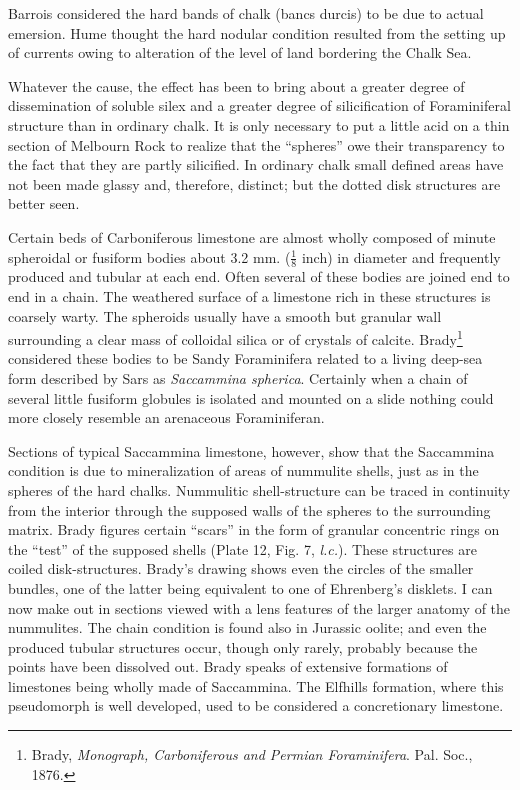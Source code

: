 \documentclass[a4paper, 12pt, oneside, landscape]{article}
\begin{document}
Barrois considered the hard bands of chalk (bancs durcis) to be due to actual emersion. Hume thought the hard nodular condition resulted from the setting up of currents owing to alteration of the level of land bordering the Chalk Sea.

Whatever the cause, the effect has been to bring about a greater degree of dissemination of soluble silex and a greater degree of silicification of Foraminiferal structure than in ordinary chalk. It is only necessary to put a little acid on a thin section of Melbourn Rock to realize that the ``spheres'' owe their transparency to the fact that they are partly silicified. In ordinary chalk small defined areas have not been made glassy and, therefore, distinct; but the dotted disk structures are better seen.

Certain beds of Carboniferous limestone are almost wholly composed of minute spheroidal or fusiform bodies about 3.2 mm. ($\frac{1}{8}$ inch) in diameter and frequently produced and tubular at each end. Often several of these bodies are joined end to end in a chain. The weathered surface of a limestone rich in these structures is coarsely warty. The spheroids usually have a smooth but granular wall surrounding a clear mass of colloidal silica or of crystals of calcite. Brady\footnote{Brady, \emph{Monograph, Carboniferous and Permian Foraminifera}. Pal. Soc., 1876.} considered these bodies to be Sandy Foraminifera related to a living deep-sea form described by Sars as \emph{Saccammina spherica}. Certainly when a chain of several little fusiform globules is isolated and mounted on a slide nothing could more closely resemble an arenaceous Foraminiferan.

Sections of typical Saccammina limestone, however, show that the Saccammina condition is due to mineralization of areas of nummulite shells, just as in the spheres of the hard chalks. Nummulitic shell-structure can be traced in continuity from the interior through the supposed walls of the spheres to the surrounding matrix. Brady figures certain ``scars'' in the form of granular concentric rings on the ``test'' of the supposed shells (Plate 12, Fig. 7, \emph{l.c.}). These structures are coiled disk-structures. Brady's drawing shows even the circles of the smaller bundles, one of the latter being equivalent to one of Ehrenberg's disklets. I can now make out in sections viewed with a lens features of the larger anatomy of the nummulites. The chain condition is found also in Jurassic oolite; and even the produced tubular structures occur, though only rarely, probably because the points have been dissolved out. Brady speaks of extensive formations of limestones being wholly made of Saccammina. The Elfhills formation, where this pseudomorph is well developed, used to be considered a concretionary limestone.
\end{document}
